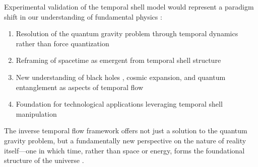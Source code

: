 \documentclass[12pt,a4paper]{article}
\begin{document}
Experimental validation of the temporal shell model would represent a paradigm shift in our understanding of fundamental physics \citep{rovelli}:

\begin{enumerate}
    \item Resolution of the quantum gravity problem through temporal dynamics rather than force quantization
    \item Reframing of spacetime as emergent from temporal shell structure
    \item New understanding of black holes \citep{hawking}, cosmic expansion, and quantum entanglement as aspects of temporal flow
    \item Foundation for technological applications leveraging temporal shell manipulation \citep{deutsch, lloyd}
\end{enumerate}

The inverse temporal flow framework offers not just a solution to the quantum gravity problem, but a fundamentally new perspective on the nature of reality itself—one in which time, rather than space or energy, forms the foundational structure of the universe \citep{barbour, carroll}.



\end{document}
